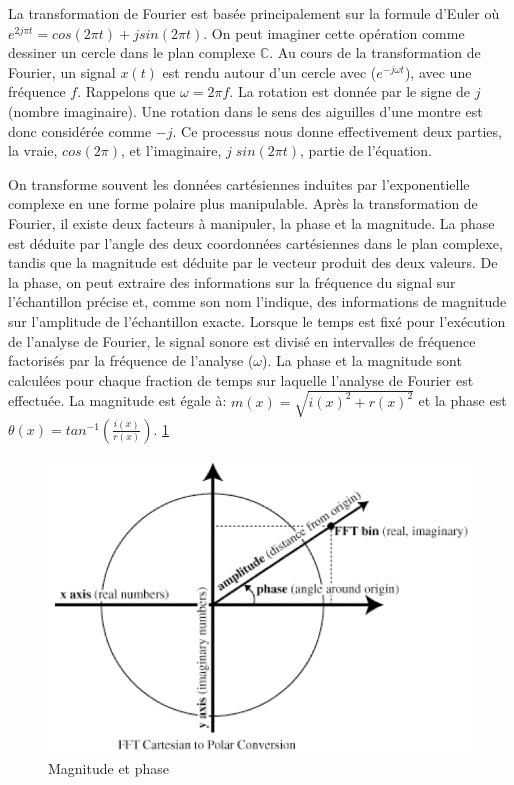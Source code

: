 La transformation de Fourier est basée principalement sur la formule d'Euler où $ e ^ {2 j \pi t} = cos (2 \pi t) + j sin (2 \pi t) $. On peut imaginer cette opération comme dessiner un cercle dans le plan complexe $ \mathbb{C} $. Au cours de la transformation de Fourier, un signal $ x(t) $ est rendu autour d'un cercle avec ($ e ^ {- j \omega t} $), avec une fréquence $ f $. Rappelons que $ \omega = 2 \pi f $. La rotation est donnée par le signe de $ j $ (nombre imaginaire). Une rotation dans le sens des aiguilles d'une montre est donc considérée comme $ -j $. Ce processus nous donne effectivement deux parties, la vraie, $ cos (2 \pi) $, et l’imaginaire, $ j \; sin (2 \pi t) $,  partie de l'équation.

On transforme souvent les données cartésiennes induites par l'exponentielle complexe en une forme polaire plus manipulable. Après la transformation de Fourier, il existe deux facteurs à manipuler, la phase et la magnitude. La phase est déduite par l'angle des deux coordonnées cartésiennes dans le plan complexe, tandis que la magnitude est déduite par le vecteur produit des deux valeurs. De la phase, on peut extraire des informations sur la fréquence du signal sur l'échantillon précise et, comme son nom l’indique, des informations de magnitude sur l’amplitude de l’échantillon exacte. Lorsque le temps est fixé pour l'exécution de l'analyse de Fourier, le signal sonore est divisé en intervalles de fréquence factorisés par la fréquence de l'analyse ($ \omega $). La phase et la magnitude sont calculées pour chaque fraction de temps sur laquelle l'analyse de Fourier est effectuée. La magnitude est égale à: $ m (x) = \sqrt{i (x) ^ 2 + r (x) ^ 2} $ et la phase est $ \theta (x) = tan ^ {- 1} (\frac{i (x)}{r (x)}) $. \ref{MagnitudePhase}

         \begin{figure}
            \centering
            \includegraphics[width = 0.5 \textwidth ]{Graphs/Fourier_Circle_2.jpg}
            \caption{Magnitude et phase}
            \label{MagnitudePhase}
        \end{figure}

